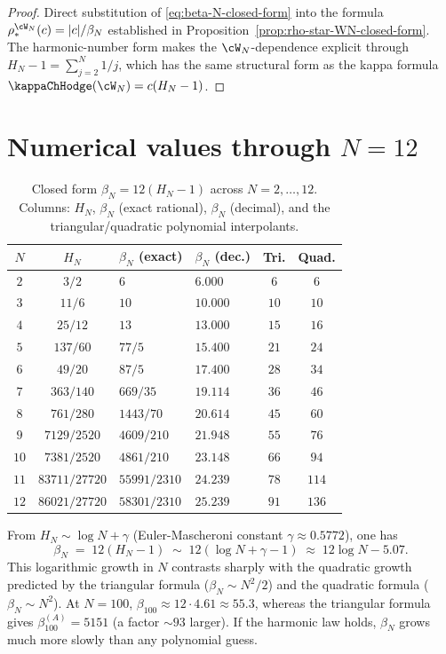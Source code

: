 \begin{proof}
Direct substitution of \eqref{eq:beta-N-closed-form} into the formula
$\rho_*^{\cW_N}(c) = |c|/\beta_N$ established in
Proposition~\ref{prop:rho-star-WN-closed-form}. The harmonic-number
form makes the $\cW_N$-dependence explicit through
$H_N - 1 = \sum_{j=2}^{N} 1/j$, which has the same structural form as
the kappa formula $\kappaChHodge(\cW_N) = c(H_N - 1)$.
\end{proof}

\section{Numerical values through $N = 12$}
\label{sec:beta-N-extended-table}

\begin{table}[h]
\centering
\caption{Closed form $\beta_N = 12(H_N - 1)$ across $N = 2, \ldots, 12$.
Columns: $H_N$, $\beta_N$ (exact rational), $\beta_N$ (decimal), and
the triangular/quadratic polynomial interpolants.}
\label{tab:beta-N-values-extended}
\renewcommand{\arraystretch}{1.2}
\begin{tabular}{|c|c|l|l|c|c|}
\hline
$N$ & $H_N$ & $\beta_N$ (exact) & $\beta_N$ (dec.) & Tri. & Quad. \\
\hline
$2$ & $3/2$ & $6$ & $6.000$ & $6$ & $6$ \\
$3$ & $11/6$ & $10$ & $10.000$ & $10$ & $10$ \\
$4$ & $25/12$ & $13$ & $13.000$ & $15$ & $16$ \\
$5$ & $137/60$ & $77/5$ & $15.400$ & $21$ & $24$ \\
$6$ & $49/20$ & $87/5$ & $17.400$ & $28$ & $34$ \\
$7$ & $363/140$ & $669/35$ & $19.114$ & $36$ & $46$ \\
$8$ & $761/280$ & $1443/70$ & $20.614$ & $45$ & $60$ \\
$9$ & $7129/2520$ & $4609/210$ & $21.948$ & $55$ & $76$ \\
$10$ & $7381/2520$ & $4861/210$ & $23.148$ & $66$ & $94$ \\
$11$ & $83711/27720$ & $55991/2310$ & $24.239$ & $78$ & $114$ \\
$12$ & $86021/27720$ & $58301/2310$ & $25.239$ & $91$ & $136$ \\
\hline
\end{tabular}
\end{table}

\begin{remark}
\label{rem:beta-asymptotic}
From $H_N \sim \log N + \gamma$ (Euler-Mascheroni constant
$\gamma \approx 0.5772$), one has
\[
 \beta_N
 \;=\;
 12(H_N - 1)
 \;\sim\;
 12 (\log N + \gamma - 1)
 \;\approx\;
 12 \log N - 5.07.
\]
This logarithmic growth in $N$ contrasts sharply with the quadratic
growth predicted by the triangular formula ($\beta_N \sim N^2/2$) and
the quadratic formula ($\beta_N \sim N^2$). At $N = 100$,
$\beta_{100} \approx 12 \cdot 4.61 \approx 55.3$, whereas the
triangular formula gives $\beta_{100}^{(A)} =
5151$ (a factor $\sim 93$ larger). If the harmonic law holds,
$\beta_N$ grows much more slowly than any polynomial guess.
\end{remark}

